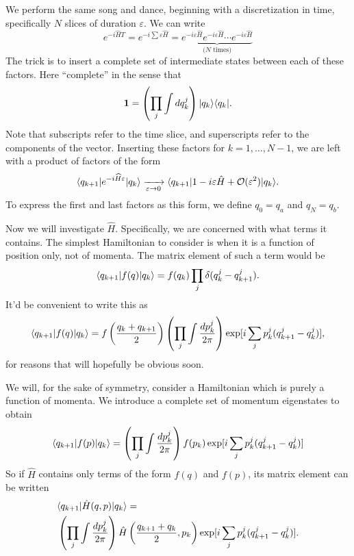 We perform the same song and dance, beginning with a
discretization in time, specifically $N$ slices of duration
$\varepsilon$. We can write
\begin{equation}%
e^{-i\widehat{H}T} = e^{-i\sum\varepsilon\widehat{H}} =
\underbrace{e^{-i\varepsilon\widehat{H}}e^{-i\varepsilon\widehat{H}}\cdots
  e^{-i\varepsilon\widehat{H}}}_{\text{($N$ times)}}
\end{equation}
The trick is to insert a complete set of intermediate states
between each of these factors. Here ``complete'' in the sense
that
\begin{equation}%
\mathbf{1} = \left(\prod_{j}\int dq^{j}_{k}\right)|q_{k}\>\<q_{k}|.
\end{equation}
Note that subscripts refer to the time slice, and superscripts
refer to the components of the vector.
Inserting these factors for $k=1,\ldots,N-1$, we are left with a
product of factors of the form 
\begin{equation}\label{eq:factorsOfMatrixForHamiltonian}
\langle q_{k+1}|e^{-i\widehat{H}\varepsilon}|q_{k}\rangle\xrightarrow[\varepsilon\to0]{}\langle q_{k+1}|1-i\varepsilon\hat{H}+\mathcal{O}(\varepsilon^2)|q_{k}\rangle.
\end{equation}
To express the first and last factors as this form, we define
$q_0=q_a$ and $q_N=q_b$.

Now we will investigate $\hat{H}$. Specifically, we are concerned
with what terms it contains. The simplest Hamiltonian to consider
is when it is a function of position only, not of momenta. The
matrix element of such a term would be
\begin{equation}%
\<q_{k+1}|f(q)|q_{k}\> = f(q_{k})\prod_{j}\delta(q^{j}_{k}-q^{j}_{k+1}).
\end{equation}
It'd be convenient to write this as
\begin{equation}%
\<q_{k+1}|f(q)|q_{k}\> = f\left(\frac{q_{k}+q_{k+1}}{2}\right)\left(\prod_{j}\int\frac{dp^{j}_{k}}{2\pi}\right)\exp[i\sum_{j}p^{j}_{k}(q^{j}_{k+1}-q^{j}_{k})],
\end{equation}
for reasons that will hopefully be obvious soon.

We will, for the sake of symmetry, consider a Hamiltonian which
is purely a function of momenta. We introduce a complete set of
momentum eigenstates to obtain
\begin{equation}%
\<q_{k+1}|f(p)|q_{k}\> = \left(\prod_{j}\int\frac{dp^{j}_{k}}{2\pi}\right)f(p_{k})\exp[i\sum_{j}p^{j}_{k}(q^{j}_{k+1}-q^{j}_{k})]
\end{equation}
So if $\hat{H}$ contains only terms of the form $f(q)$ and
$f(p)$, its matrix element can be written
\begin{equation}\label{eq:matrixElementForHamiltonianGuessOne}
\begin{split}
&\langle q_{k+1}|\hat{H}(q,p)|q_{k}\rangle = \\ &
\left(\prod_{j}\int\frac{dp^{j}_{k}}{2\pi}\right)\hat{H}
\left(\frac{q_{k+1}+q_{k}}{2},p_{k}\right)
\exp[i\sum_{j}p^{j}_{k}(q^{j}_{k+1}-q^{j}_{k})].
\end{split}
\end{equation}

